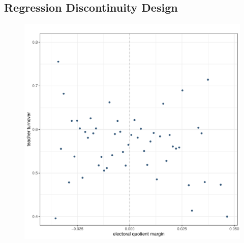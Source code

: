 \pagebreak

\subsection{Regression Discontinuity Design}

\begin{figure}[h]
    \centering
    \includegraphics[width=0.7\linewidth]{chapters/chapter_1/plots/visual_rdd_legislative_seat_flip.pdf}
\end{figure}




